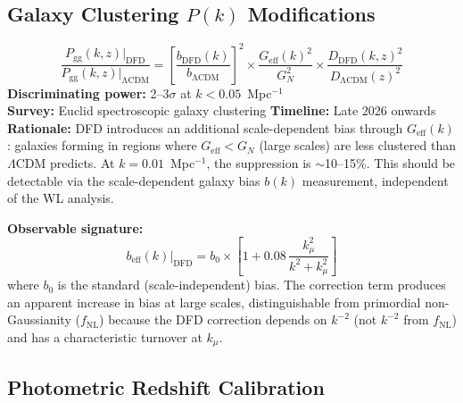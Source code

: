 \documentclass[12pt]{article}
\newcommand{\LCDM}{$\Lambda$CDM}
\begin{document}
\subsection{Galaxy Clustering $P(k)$ Modifications}

\begin{predbox}
\begin{equation}
\boxed{
\frac{P_\mathrm{gg}(k,z)\big|_\mathrm{DFD}}{P_\mathrm{gg}(k,z)\big|_\mathrm{\Lambda CDM}} = \left[\frac{b_\mathrm{DFD}(k)}{b_\mathrm{\Lambda CDM}}\right]^2 \times \frac{G_\mathrm{eff}(k)^2}{G_N^2} \times \frac{D_\mathrm{DFD}(k,z)^2}{D_\mathrm{\Lambda CDM}(z)^2}
}
\end{equation}
\textbf{Discriminating power:} 2--3$\sigma$ at $k < 0.05$~Mpc$^{-1}$\\
\textbf{Survey:} Euclid spectroscopic galaxy clustering \quad\textbf{Timeline:} Late 2026 onwards\\
\textbf{Rationale:} DFD introduces an additional scale-dependent bias through $G_\mathrm{eff}(k)$: galaxies forming in regions where $G_\mathrm{eff} < G_N$ (large scales) are less clustered than \LCDM{} predicts. At $k = 0.01$~Mpc$^{-1}$, the suppression is $\sim$10--15\%. This should be detectable via the scale-dependent galaxy bias $b(k)$ measurement, independent of the WL analysis.

\medskip\noindent
\textbf{Observable signature:}
\begin{equation}
b_\mathrm{eff}(k)\bigg|_\mathrm{DFD} = b_0 \times \left[1 + 0.08\,\frac{k_\mu^2}{k^2 + k_\mu^2}\right]
\end{equation}
where $b_0$ is the standard (scale-independent) bias. The correction term produces an apparent increase in bias at large scales, distinguishable from primordial non-Gaussianity ($f_\mathrm{NL}$) because the DFD correction depends on $k^{-2}$ (not $k^{-2}$ from $f_\mathrm{NL}$) and has a characteristic turnover at $k_\mu$.
\end{predbox}

\subsection{Photometric Redshift Calibration}
\end{document}
